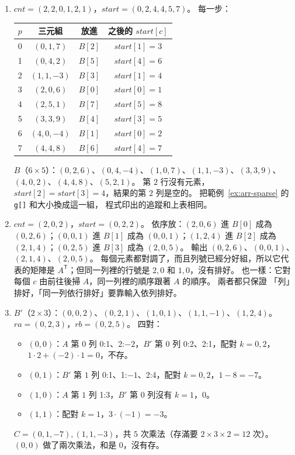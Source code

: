 \begin{enumerate}
\item $\mathit{cnt} = (2, 2, 0, 1, 2, 1)$，$\mathit{start} = (0, 2, 4, 4, 5, 7)$。 每一步：
\begin{center}
\begin{tabular}{cccc}
\toprule
$p$ & 三元組 & 放進 & 之後的 $\mathit{start}[c]$ \\
\midrule
0 & $(0,1,7)$ & $B[2]$ & $\mathit{start}[1] = 3$ \\
1 & $(0,4,2)$ & $B[5]$ & $\mathit{start}[4] = 6$ \\
2 & $(1,1,-3)$ & $B[3]$ & $\mathit{start}[1] = 4$ \\
3 & $(2,0,6)$ & $B[0]$ & $\mathit{start}[0] = 1$ \\
4 & $(2,5,1)$ & $B[7]$ & $\mathit{start}[5] = 8$ \\
5 & $(3,3,9)$ & $B[4]$ & $\mathit{start}[3] = 5$ \\
6 & $(4,0,-4)$ & $B[1]$ & $\mathit{start}[0] = 2$ \\
7 & $(4,4,8)$ & $B[6]$ & $\mathit{start}[4] = 7$ \\
\bottomrule
\end{tabular}
\end{center}
$B$（$6 \times 5$）：$(0,2,6)$、$(0,4,-4)$、$(1,0,7)$、$(1,1,-3)$、$(3,3,9)$、$(4,0,2)$、$(4,4,8)$、$(5,2,1)$。 第 $2$ 行沒有元素，$\mathit{start}[2] = \mathit{start}[3] = 4$，結果的第
$2$ 列是空的。 把範例~\ref{ex:arr-sparse} 的 \texttt{g[]} 和大小換成這一組，
程式印出的追蹤和上表相同。

\item $\mathit{cnt} = (2, 0, 2)$，$\mathit{start} = (0, 2, 2)$。 依序放：$(2,0,6)$ 進
$B[0]$ 成為 $(0,2,6)$；$(0,0,1)$ 進 $B[1]$ 成為 $(0,0,1)$；$(1,2,4)$ 進 $B[2]$ 成為
$(2,1,4)$；$(0,2,5)$ 進 $B[3]$ 成為 $(2,0,5)$。 輸出 $(0,2,6)$、$(0,0,1)$、$(2,1,4)$、$(2,0,5)$。 每個元素都對調了，而且列號已經分好組，所以它代表的矩陣是
$A^{\mathsf T}$；但同一列裡的行號是 $2, 0$ 和 $1, 0$，沒有排好。 
也一樣：它對每個 $c$ 由前往後掃 $A$，同一列裡的順序跟著 $A$ 的順序。 兩者都只保證
「列」排好，「同一列依行排好」要靠輸入依列排好。

\item $B'$（$2 \times 3$）：$(0,0,2)$、$(0,2,1)$、$(1,0,1)$、$(1,1,-1)$、$(1,2,4)$。
$\mathit{ra} = (0, 2, 3)$，$\mathit{rb} = (0, 2, 5)$。 四對：
\begin{itemize}
\item $(0, 0)$：$A$ 第 $0$ 列 0:1、2:$-2$，$B'$ 第 $0$ 列 0:2、2:1，配對 $k = 0, 2$，
$1 \cdot 2 + (-2) \cdot 1 = 0$，不存。
\item $(0, 1)$：$B'$ 第 $1$ 列 0:1、1:$-1$、2:4，配對 $k = 0, 2$，$1 - 8 = -7$。
\item $(1, 0)$：$A$ 第 $1$ 列 1:3，$B'$ 第 $0$ 列沒有 $k = 1$，$0$。
\item $(1, 1)$：配對 $k = 1$，$3 \cdot (-1) = -3$。
\end{itemize}
$C = (0,1,-7), (1,1,-3)$，共 $5$ 次乘法（存滿要 $2 \times 3 \times 2 = 12$ 次）。
$(0, 0)$ 做了兩次乘法，和是 $0$，沒有存。


\end{enumerate}
